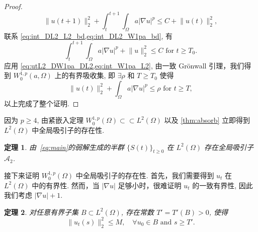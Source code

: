 \documentclass[twoside,longtitle]{LZUthesis}
\newtheorem{theorem}{定理}[chapter]
\theoremstyle{definition}
\numberwithin{equation}{chapter}
\newcommand*\abs[1]{\lvert#1\rvert}
\newcommand*\norm[1]{\lVert#1\rVert}
\newcommand*\Brace[1]{\lbrace#1\rbrace}
\begin{document}
\begin{proof}
\begin{equation}
		\norm{u(t+1)}_2^2
		+ \int_t^{t+1}\int_{\Omega}a \abs{\nabla u}^p
		\leq C + \norm{u(t)}_2^2,
	\end{equation}
	联系 \cref{eq:int_DL2_L2_bd,eq:int_DL2_W1pa_bd}, 有
	\begin{equation}\label{eq:int_W1pa_L2}
		\int_t^{t+1}\int_{\Omega}a \abs{\nabla u}^p
		+ \norm{u}_2^2 \leq C \text{ for } t \geq T_0.
	\end{equation}
	应用 \cref{eq:utL2_DW1pa_DL2,eq:int_W1pa_L2}, 由一致 Gr\"onwall 引理，我们得到 $W_0^{1,p}(a,\Omega)$ 上的有界吸收集,
	即 $\exists \rho$ 和 $T \geq T_{0}$ 使得
	\begin{equation}\label{eq:uL2_W1pa_bd}
		\norm{u(t)}_2^2 + \int_{\Omega}a\abs{\nabla u}^p \leq \rho \text{ for } t \geq T,
	\end{equation}
	以上完成了整个证明.
\end{proof}
因为 $p \geq 4$, 由紧嵌入定理
$W_0^{1,p}(\Omega) \subset\subset L^2(\Omega)$
以及 \cref{thm:absorb} 立即得到 $L^2(\Omega)$ 中全局吸引子的存在性.
\begin{theorem}\label{thm:attractor_L2}
	由~\cref{eq:main}的弱解生成的半群 $\Brace{S(t)}_{t \geq 0}$ 在
	$L^2(\Omega)$ 存在全局吸引子 $\mathcal{A}_2$.
\end{theorem}
接下来证明 $W_0^{1,p}(\Omega)$ 中全局吸引子的存在性. 首先，我们需要得到 $u_t$ 在 $L^2(\Omega)$ 中的有界性.
然而，当 $\abs{\nabla u}$ 足够小时，很难证明 $u_t$ 的一致有界性, 因此我们考虑 $\abs{\nabla u}+1$.
\begin{theorem}\label{thm:ut_L2_bd}
	对任意有界子集 $B \subset L^2(\Omega)$,
	存在常数 $T' = T'(B) > 0$, 使得
	\begin{equation}
		\norm{u_t(s)}_2^2 \leq M, \quad \forall u_0 \in B \text{ and } s \geq T'.
	\end{equation}
\end{theorem}
\end{document}
